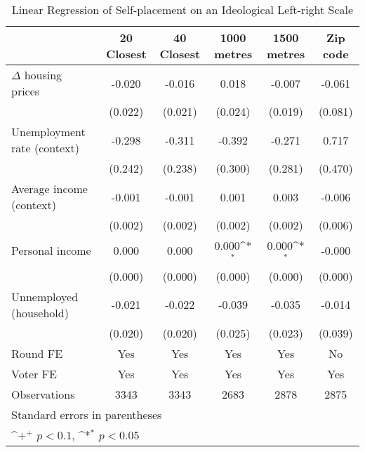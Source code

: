 \begin{table}[htbp]\centering
\def\sym#1{\ifmmode^{#1}\else\(^{#1}\)\fi}
\caption{Linear Regression of Self-placement on an Ideological Left-right Scale } \footnotesize \label{lrscale}
\begin{tabular}{l*{5}{c}}
\hline\hline
                    &\multicolumn{1}{c}{20 Closest}&\multicolumn{1}{c}{40 Closest}&\multicolumn{1}{c}{1000 metres}&\multicolumn{1}{c}{1500 metres}&\multicolumn{1}{c}{Zip code}\\
\hline
$\Delta$ housing prices&      -0.020       &      -0.016       &       0.018       &      -0.007       &      -0.061       \\
                    &     (0.022)       &     (0.021)       &     (0.024)       &     (0.019)       &     (0.081)       \\
[1em]
Unemployment rate (context)&      -0.298       &      -0.311       &      -0.392       &      -0.271       &       0.717       \\
                    &     (0.242)       &     (0.238)       &     (0.300)       &     (0.281)       &     (0.470)       \\
[1em]
Average income (context)&      -0.001       &      -0.001       &       0.001       &       0.003       &      -0.006       \\
                    &     (0.002)       &     (0.002)       &     (0.002)       &     (0.002)       &     (0.006)       \\
[1em]
Personal income     &       0.000       &       0.000       &       0.000\sym{*}&       0.000\sym{*}&      -0.000       \\
                    &     (0.000)       &     (0.000)       &     (0.000)       &     (0.000)       &     (0.000)       \\
[1em]
Unnemployed (household)&      -0.021       &      -0.022       &      -0.039       &      -0.035       &      -0.014       \\
                    &     (0.020)       &     (0.020)       &     (0.025)       &     (0.023)       &     (0.039)       \\
[1em]
\hline  Round FE    &         Yes       &         Yes       &         Yes       &         Yes       &          No       \\
[1em]
Voter FE            &         Yes       &         Yes       &         Yes       &         Yes       &         Yes       \\
\hline
Observations        &        3343       &        3343       &        2683       &        2878       &        2875       \\
\hline\hline
\multicolumn{6}{l}{\footnotesize Standard errors in parentheses}\\
\multicolumn{6}{l}{\footnotesize \sym{+} \(p<0.1\), \sym{*} \(p<0.05\)}\\
\end{tabular}
\end{table}
